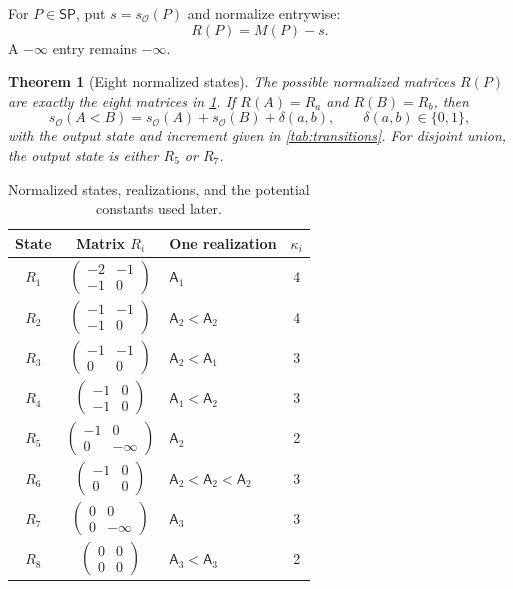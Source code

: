 \documentclass[11pt]{article}
\newtheorem{theorem}{Theorem}[section]
\theoremstyle{definition}
\newcommand{\OO}{\mathcal O}
\newcommand{\sO}{s_{\OO}}
\newcommand{\SP}{\mathsf{SP}}
\newcommand{\A}[1]{\mathsf A_{#1}}
\newcommand{\smat}[4]{\left(\begin{smallmatrix}#1&#2\\#3&#4\end{smallmatrix}\right)}
\begin{document}
For $P\in\SP$, put $s=\sO(P)$ and normalize entrywise:
\[
R(P)=M(P)-s.
\]
A $-\infty$ entry remains $-\infty$.

\begin{theorem}[Eight normalized states]\label{thm:states}
The possible normalized matrices $R(P)$ are exactly the eight matrices in \cref{tab:states}. If $R(A)=R_a$ and $R(B)=R_b$, then
\begin{equation}\label{eq:delta}
\sO(A<B)=\sO(A)+\sO(B)+\delta(a,b),
\qquad\delta(a,b)\in\{0,1\},
\end{equation}
with the output state and increment given in \cref{tab:transitions}. For disjoint union, the output state is either $R_5$ or $R_7$.
\end{theorem}

\begin{table}[htbp]
\centering
\caption{Normalized states, realizations, and the potential constants used later.}\label{tab:states}
\renewcommand{\arraystretch}{1.4}
\begin{tabular}{c c l c}
\toprule
State & Matrix $R_i$ & One realization & $\kappa_i$\\
\midrule
$R_1$ & $\smat{-2}{-1}{-1}{0}$ & $\A1$ & 4\\
$R_2$ & $\smat{-1}{-1}{-1}{0}$ & $\A2<\A2$ & 4\\
$R_3$ & $\smat{-1}{-1}{0}{0}$ & $\A2<\A1$ & 3\\
$R_4$ & $\smat{-1}{0}{-1}{0}$ & $\A1<\A2$ & 3\\
$R_5$ & $\smat{-1}{0}{0}{-\infty}$ & $\A2$ & 2\\
$R_6$ & $\smat{-1}{0}{0}{0}$ & $\A2<\A2<\A2$ & 3\\
$R_7$ & $\smat{0}{0}{0}{-\infty}$ & $\A3$ & 3\\
$R_8$ & $\smat{0}{0}{0}{0}$ & $\A3<\A3$ & 2\\
\bottomrule
\end{tabular}
\end{table}
\end{document}
